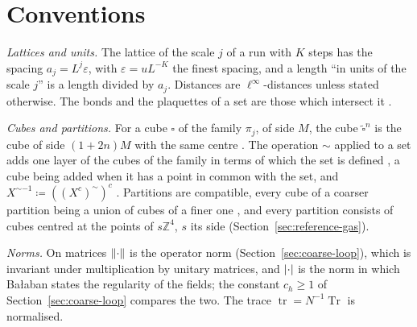 \documentclass[11pt]{preprint}
\newcommand{\tr}{\operatorname{tr}}
\DeclarePairedDelimiter{\abs}{\lvert}{\rvert}
\DeclarePairedDelimiter{\norm}{\lVert}{\rVert}
\numberwithin{equation}{section}
\theoremstyle{definition}
\theoremstyle{remark}
\theoremstyle{plain}
\begin{document}
\section{Conventions}\label{app:conventions}

\emph{Lattices and units.} The lattice of the scale $j$ of a run with $K$ steps has the spacing $a_j = L^j\varepsilon$, with $\varepsilon = uL^{-K}$ the finest spacing, and a length ``in units of the scale $j$'' is a length divided by $a_j$. Distances are $\ell^\infty$-distances unless stated otherwise. The bonds and the plaquettes of a set are those which intersect it \cite[p.~251]{BalabanRG1}.

\emph{Cubes and partitions.} For a cube $\square$ of the family $\pi_j$, of side $M$, the cube $\tilde\square^n$ is the cube of side $(1 + 2n)M$ with the same centre \cite[p.~257]{BalabanRG1}. The operation $\sim$ applied to a set adds one layer of the cubes of the family in terms of which the set is defined \cite[p.~245]{BalabanCRE}, a cube being added when it has a point in common with the set, and $X^{\sim-1} \coloneqq ((X^c)^\sim)^c$ \cite[p.~247]{BalabanCRE}. Partitions are compatible, every cube of a coarser partition being a union of cubes of a finer one \cite[p.~245]{BalabanCRE}, and every partition consists of cubes centred at the points of $s\mathbb Z^4$, $s$ its side (Section~\ref{sec:reference-gas}).

\emph{Norms.} On matrices $\norm{\cdot}$ is the operator norm (Section~\ref{sec:coarse-loop}), which is invariant under multiplication by unitary matrices, and $\abs{\cdot}$ is the norm in which Ba{\l}aban states the regularity of the fields; the constant $c_h \geq 1$ of Section~\ref{sec:coarse-loop} compares the two. The trace $\tr = N^{-1}\operatorname{Tr}$ is normalised.
\end{document}
